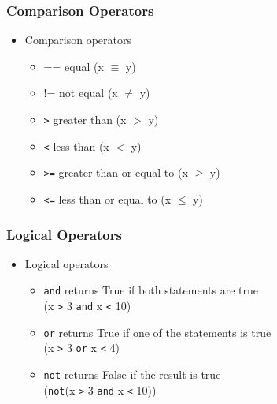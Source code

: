 \documentclass{beamer}
\newcommand{\hrefu}[2]{\underline{\href{#1}{#2}}}
\begin{document}
\begin{frame}
  \frametitle{\hrefu{https://docs.python.org/3/reference/expressions.html\#comparisons}{Comparison Operators}}
  \begin{itemize}
    \item Comparison operators
    \begin{itemize}
      \item == equal (x $\equiv$ y)
      \item != not equal (x $\neq$ y)
      \item \texttt{>} greater than (x $>$ y)
      \item \texttt{<} less than (x $<$ y)
      \item \texttt{>=} greater than or equal to (x $\geq$ y)
      \item \texttt{<=} less than or equal to (x $\leq$ y)
    \end{itemize}
  \end{itemize}
\end{frame}

\begin{frame}
  \frametitle{Logical Operators}
  \begin{itemize}
    \item Logical operators
    \begin{itemize}
      \item \texttt{and} returns True if both statements are true \\(x \texttt{>} 3 \texttt{and} x \texttt{<} 10)
      \item \texttt{or} returns True if one of the statements is true \\(x \texttt{>} 3 \texttt{or} x \texttt{<} 4) 
      \item \texttt{not} returns False if the result is true \\(\texttt{not}(x \texttt{>} 3 \texttt{and} x \texttt{<} 10))
    \end{itemize}
  \end{itemize}
\end{frame}
\end{document}

